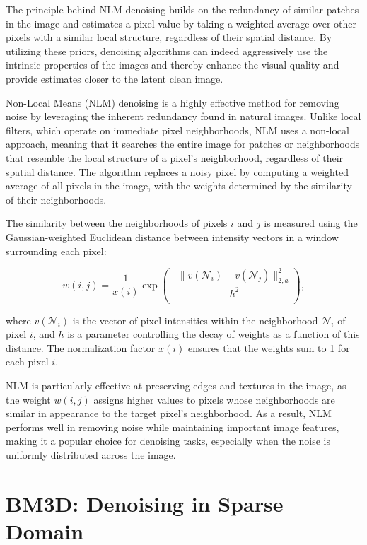 The principle behind \gls{NLM} denoising builds on the redundancy of similar patches in the image and estimates a pixel value by taking a weighted average over other pixels with a similar local structure, regardless of their spatial distance. By utilizing these priors, denoising algorithms can indeed aggressively use the intrinsic properties of the images and thereby enhance the visual quality and provide estimates closer to the latent clean image.

Non-Local Means (NLM) denoising is a highly effective method for removing noise by leveraging the inherent redundancy found in natural images. Unlike local filters, which operate on immediate pixel neighborhoods, NLM uses a non-local approach, meaning that it searches the entire image for patches or neighborhoods that resemble the local structure of a pixel's neighborhood, regardless of their spatial distance. The algorithm replaces a noisy pixel by computing a weighted average of all pixels in the image, with the weights determined by the similarity of their neighborhoods.

The similarity between the neighborhoods of pixels $i$ and $j$ is measured using the Gaussian-weighted Euclidean distance between intensity vectors in a window surrounding each pixel:

\begin{equation}
    w(i,j) = \frac{1}{x(i)} \exp \left( -\frac{\|v(\mathcal{N}_i) - v(\mathcal{N}_j)\|_{2,a}^2}{h^2} \right),
\end{equation}

where $v(\mathcal{N}_i)$ is the vector of pixel intensities within the neighborhood $\mathcal{N}_i$ of pixel $i$, and $h$ is a parameter controlling the decay of weights as a function of this distance. The normalization factor $x(i)$ ensures that the weights sum to 1 for each pixel $i$.

NLM is particularly effective at preserving edges and textures in the image, as the weight $w(i,j)$ assigns higher values to pixels whose neighborhoods are similar in appearance to the target pixel's neighborhood. As a result, NLM performs well in removing noise while maintaining important image features, making it a popular choice for denoising tasks, especially when the noise is uniformly distributed across the image.


\section{BM3D: Denoising in Sparse Domain}

